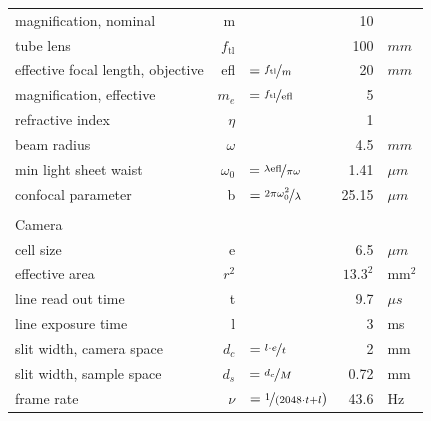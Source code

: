 \documentclass[12pt]{spieman}  %
\begin{document}
\begin{landscape}
\begin{table}[t!]
\begin{tabular}{lrlrl}
		magnification,	nominal											& m								&																																					& 10			&					\\
		tube lens 																	& $f_{\text{tl}}$	&																																					& 100			&	$mm$		\\
		effective focal length, objective						& efl							& $=\nicefrac{f_{\text{tl}}}{m}$																					& 20			& $mm$		\\
		magnification, effective										& $m_e$						&	$=\nicefrac{f_{\text{tl}}}{\text{efl}}$																	& 5				&					\\
		refractive index														&	$\eta$					&																																					& 1				& 				\\
		beam radius																	& $\omega$				&																																					& 4.5			& $mm$		\\
		min light sheet waist												& $\omega_0$			& $=\nicefrac{\lambda \text{efl}}{\pi \omega}$														& 1.41		& $\mu m$	\\
		confocal parameter													& b								& $=\nicefrac{2 \pi \omega_0^2}{\lambda}$																	& 25.15		& $\mu m$	\\\\
		\multicolumn{5}{l}{Camera}\\\hline\hline
		cell size																		& e								&																																					& 6.5			&	$\mu m$	\\
		effective area 															& $r^2$						&																																					& $13.3^2$	&	$\text{mm}^2$	\\
		line read out time													& t								&																																					& 9.7			&	$\mu s$	\\
		line exposure time													& l								&																																					& 3				&	ms			\\
		slit width, camera space										& $d_c$						& $=\nicefrac{l \cdot e}{t} $																							& 2				&	mm	\\
		slit width, sample space										& $d_s$						&	$=\nicefrac{d_c}{M}$																										& 0.72		&	mm	\\
		frame rate																	& $\nu$						&	$=\nicefrac{1}{(2048 \cdot t + l})$																			& 43.6		& Hz\\
		\end{tabular}
\end{table}
\end{landscape}		
		
\end{document}

